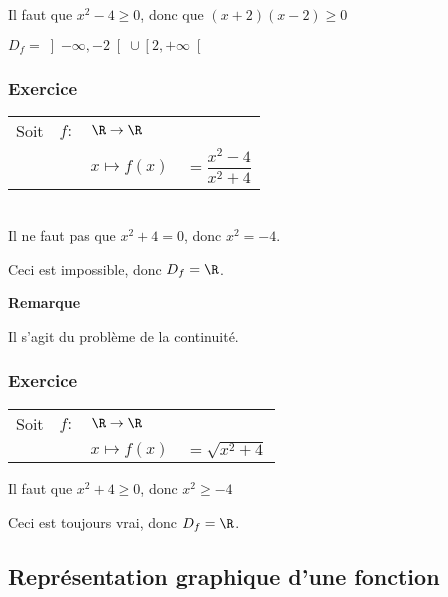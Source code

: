 Il faut que $x^2 - 4 \geqslant 0 $, donc que $\left(x+2\right)\left(x-2\right) \geqslant 0$


$D_f = \left]-\infty,-2\right[\cup\left[2,+\infty\right[ $

\subsubsection{Exercice }

\begin{tabular}{llll}

Soit & $f:$& $ \R \rightarrow \R$ & \\
& & $x\mapsto f(x)$ & $=\dfrac{x^2 - 4}{x^2 + 4}$ \\
\end{tabular}\\

Il ne faut pas que $x^2 + 4 = 0$, donc $x^2 = -4$.

Ceci est impossible, donc $D_f = \R$.

\textbf{Remarque}

Il s'agit du problème de la continuité.

\subsubsection{Exercice }

\begin{tabular}{llll}

Soit & $f:$& $ \R \rightarrow \R$ & \\
& & $x\mapsto f(x)$ & $=\sqrt{x^2 + 4}$ \\
\end{tabular}

Il faut que $x^2+4 \geqslant 0$, donc $x^2 \geqslant -4$

Ceci est toujours vrai, donc $D_f = \R$.

\subsection{Représentation graphique d'une fonction}

